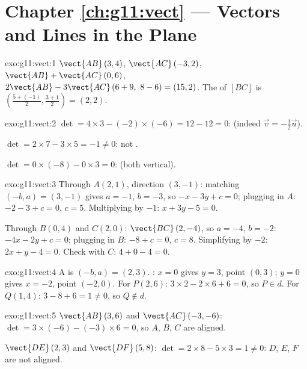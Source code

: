 \section*{Chapter \ref{ch:g11:vect} --- Vectors and Lines in the Plane}

\begin{solution}{exo:g11:vect:1}
$\vect{AB}\,(3, 4)$, $\vect{AC}\,(-3, 2)$,
$\vect{AB} + \vect{AC}\,(0, 6)$,
$2\vect{AB} - 3\vect{AC}\,(6 + 9,\ 8 - 6) = (15, 2)$. The  of
$[BC]$ is $\left(\frac{5 + (-1)}{2}, \frac{3+1}{2}\right) = (2, 2)$.
\end{solution}

\begin{solution}{exo:g11:vect:2}
$\det = 4 \times 3 - (-2) \times (-6) = 12 - 12 = 0$:  (indeed
$\vec v = -\frac12 \vec u$).

$\det = 2 \times 7 - 3 \times 5 = -1 \neq 0$: not .

$\det = 0 \times (-8) - 0 \times 3 = 0$:  (both vertical).
\end{solution}

\begin{solution}{exo:g11:vect:3}
Through $A(2,1)$, direction $(3, -1)$: matching $(-b, a) = (3, -1)$ gives
$a = -1$, $b = -3$, so $-x - 3y + c = 0$; plugging in $A$: $-2 - 3 + c =
0$, $c = 5$. Multiplying by $-1$: $x + 3y - 5 = 0$.

Through $B(0,4)$ and $C(2,0)$: $\vect{BC}\,(2, -4)$, so $a = -4$,
$b = -2$: $-4x - 2y + c = 0$; plugging in $B$: $-8 + c = 0$, $c = 8$.
Simplifying by $-2$: $2x + y - 4 = 0$. Check with $C$: $4 + 0 - 4 = 0$.
\end{solution}

\begin{solution}{exo:g11:vect:4}
A  is $(-b, a) = (2, 3)$. : $x = 0$ gives
$y = 3$, point $(0, 3)$; $y = 0$ gives $x = -2$, point $(-2, 0)$. For
$P(2,6)$: $3 \times 2 - 2 \times 6 + 6 = 0$, so $P \in d$. For $Q(1,4)$:
$3 - 8 + 6 = 1 \neq 0$, so $Q \notin d$.
\end{solution}

\begin{solution}{exo:g11:vect:5}
$\vect{AB}\,(3, 6)$ and $\vect{AC}\,(-3, -6)$:
$\det = 3 \times (-6) - (-3) \times 6 = 0$, so $A$, $B$, $C$ are aligned.

$\vect{DE}\,(2, 3)$ and $\vect{DF}\,(5, 8)$:
$\det = 2 \times 8 - 5 \times 3 = 1 \neq 0$: $D$, $E$, $F$ are not
aligned.
\end{solution}

